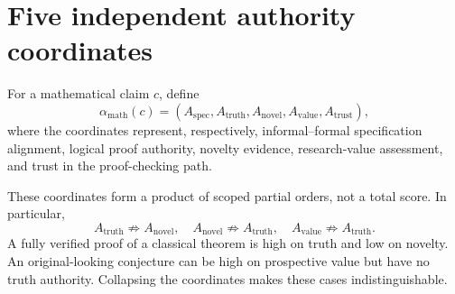 \section{Five independent authority coordinates}

\begin{definition}
For a mathematical claim $c$, define
\[
\alpha_{\mathrm{math}}(c)=
(A_{\mathrm{spec}},A_{\mathrm{truth}},A_{\mathrm{novel}},A_{\mathrm{value}},A_{\mathrm{trust}}),
\]
where the coordinates represent, respectively, informal--formal specification alignment, logical proof authority, novelty evidence, research-value assessment, and trust in the proof-checking path.
\end{definition}

These coordinates form a product of scoped partial orders, not a total score. In particular,
\[
A_{\mathrm{truth}}\not\Rightarrow A_{\mathrm{novel}},
\quad
A_{\mathrm{novel}}\not\Rightarrow A_{\mathrm{truth}},
\quad
A_{\mathrm{value}}\not\Rightarrow A_{\mathrm{truth}}.
\]
A fully verified proof of a classical theorem is high on truth and low on novelty. An original-looking conjecture can be high on prospective value but have no truth authority. Collapsing the coordinates makes these cases indistinguishable.
